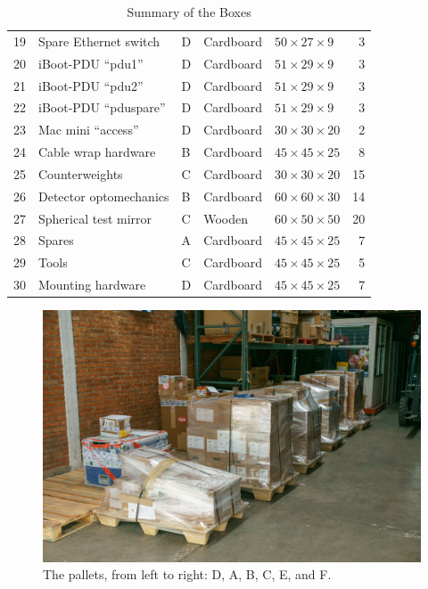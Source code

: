 \documentclass{article}
\begin{document}
\begin{table}[p]
\begin{center}
\begin{tabular}{lllllr}
19	&Spare Ethernet switch              &D&Cardboard	&$50 \times 27 \times 9$    &3\\
20	&iBoot-PDU “pdu1”	                &D&Cardboard  &$51 \times 29 \times 9$    &3\\
21	&iBoot-PDU “pdu2”	                &D&Cardboard  &$51 \times 29 \times 9$    &3\\
22	&iBoot-PDU “pduspare”               &D&Cardboard  &$51 \times 29 \times 9$    &3\\
23	&Mac mini “access”                  &D&Cardboard  &$30 \times 30 \times 20$   &2\\
24	&Cable wrap hardware                &B&Cardboard  &$45 \times 45 \times 25$   &8\\
25	&Counterweights                     &C&Cardboard  &$30 \times 30 \times 20$   &15\\ %
26	&Detector optomechanics             &B&Cardboard  &$60 \times 60 \times 30$   &14\\
27	&Spherical test mirror              &C&Wooden     &$60 \times 50 \times 50$   &20\\
28	&Spares	                            &A&Cardboard  &$45 \times 45 \times 25$   &7\\
29	&Tools                              &C&Cardboard  &$45 \times 45 \times 25$   &5\\
30  &Mounting hardware                  &D&Cardboard  &$45 \times 45 \times 25$   &7\\
\hline
\end{tabular}
\end{center}
\caption{Summary of the Boxes}
\label{table:summary}
\end{table}

\begin{figure}[bp]
\begin{center}
\includegraphics[width=1.0\linewidth]{figures/20210318T113358.jpg}
\end{center}
\caption{The pallets, from left to right: D, A, B, C, E, and F.}
\label{figure:pallets}
\end{figure}
\end{document}
